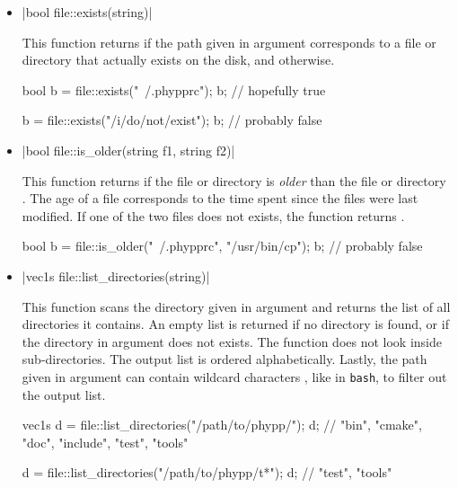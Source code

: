 \documentclass[12pt]{report}
\newcommand*\circled[1]{\tikz[baseline=(char.base)]{
            \node[shape=circle,draw,inner sep=0.0pt] (char) {#1};}}
\newcommand{\vectorfuncsym}{\circled{$\hspace{-1pt}\mathcal{V}$}\xspace}
\newcommand{\vectorfunc}{\vectorfuncsym\hspace{2pt}\xspace}
\newenvironment{example}
{
    \begin{mdframed}[style=example,frametitle={Example}]
}
{
    \end{mdframed}
}
\newcommand{\cpptrue}{\cppinline{true}\xspace}
\newcommand{\cppfalse}{\cppinline{false}\xspace}
\begin{document}
\begin{itemize}
\item \vectorfunc \cppinline|bool file::exists(string)| 

This function returns \cpptrue if the path given in argument corresponds to a file or directory that actually exists on the disk, and \cppfalse otherwise.

\begin{example}
\begin{cppcode}
bool b = file::exists("~/.phypprc");
b; // hopefully true

b = file::exists("/i/do/not/exist");
b; // probably false
\end{cppcode}
\end{example}

\item \cppinline|bool file::is_older(string f1, string f2)| 

This function returns \cpptrue if the file or directory  is \emph{older} than the file or directory . The age of a file corresponds to the time spent since the files were last modified. If one of the two files does not exists, the function returns \cppfalse.

\begin{example}
\begin{cppcode}
bool b = file::is_older("~/.phypprc", "/usr/bin/cp");
b; // probably false
\end{cppcode}
\end{example}

\item \cppinline|vec1s file::list_directories(string)| 

This function scans the directory given in argument and returns the list of all directories it contains. An empty list is returned if no directory is found, or if the directory in argument does not exists. The function does not look inside sub-directories. The output list is ordered alphabetically. Lastly, the path given in argument can contain wildcard characters \cppinline{*}, like in \texttt{bash}, to filter out the output list.

\begin{example}
\begin{cppcode}
vec1s d = file::list_directories("/path/to/phypp/");
d; // {"bin", "cmake", "doc", "include", "test", "tools"}

d = file::list_directories("/path/to/phypp/t*");
d; // {"test", "tools"}
\end{cppcode}
\end{example}


\end{itemize}
\end{document}

